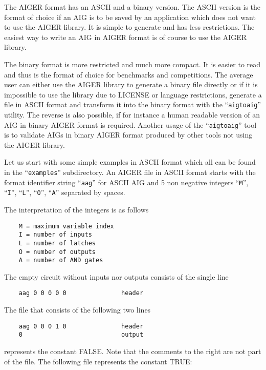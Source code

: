 \documentclass[10pt]{llncs}
\begin{document}
  The AIGER format has an ASCII and a binary version.  The ASCII version is
  the format of choice if an AIG is to be saved by an application which
  does not want to use the AIGER library.  It is simple to generate and has
  less restrictions.  The easiest way to write an AIG in AIGER format is of
  course to use the AIGER library.
  
  The binary format is more restricted and much more compact.  It is easier
  to read and thus is the format of choice for benchmarks and competitions.
  The average user can either use the AIGER library to generate a binary
  file directly or if it is impossible to use the library due to LICENSE or
  language restrictions, generate a file in ASCII format and transform
  it into the binary format with the ``\texttt{aigtoaig}'' utility.
  The reverse is also
  possible, if for instance a human readable version of an AIG in binary
  AIGER format is required.  Another usage of the ``\texttt{aigtoaig}'' tool is to
  validate AIGs in binary AIGER format produced by other tools not using
  the AIGER library.

  Let us start with some simple examples in ASCII format which all can be
  found in the ``\texttt{examples}'' subdirectory.  An AIGER file in ASCII format
  starts with the format identifier string ``\texttt{aag}'' for ASCII AIG and 5 non
  negative integers ``\texttt{M}'', ``\texttt{I}'', ``\texttt{L}'', ``\texttt{O}'',
  ``\texttt{A}'' separated by spaces.

  The interpretation of the integers is as follows

\begin{verbatim}
    M = maximum variable index
    I = number of inputs
    L = number of latches
    O = number of outputs
    A = number of AND gates
\end{verbatim}

  The empty circuit without inputs nor outputs consists of the single line

\begin{verbatim}
    aag 0 0 0 0 0               header
\end{verbatim}
  
  The file that consists of the following two lines

\begin{verbatim}
    aag 0 0 0 1 0               header
    0                           output
\end{verbatim}

  represents the constant FALSE.  Note that the comments to the right are
  not part of the file.  The following file represents the constant TRUE:
    
\end{document}
